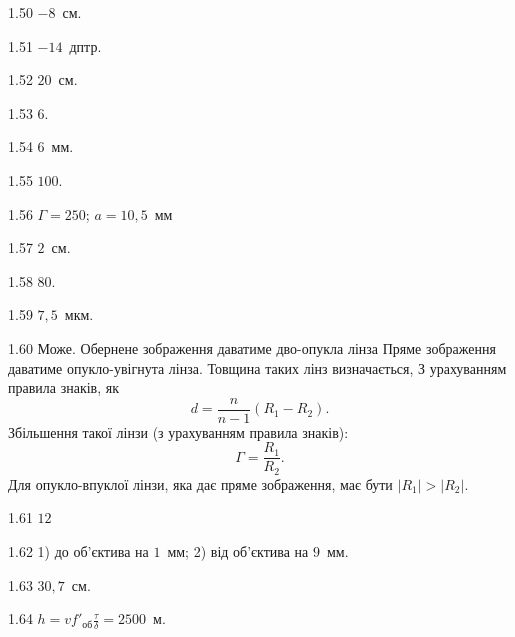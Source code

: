 \begin{Solution}{1.{50}}
	$-8$~см.
\end{Solution}
\begin{Solution}{1.{51}}
	$-14$~дптр.
\end{Solution}
\begin{Solution}{1.{52}}
	$20$~см.
\end{Solution}
\begin{Solution}{1.{53}}
	$6$.
\end{Solution}
\begin{Solution}{1.{54}}
	$6$~мм.
\end{Solution}
\begin{Solution}{1.{55}}
	$100$.
\end{Solution}
\begin{Solution}{1.{56}}
	$\Gamma = 250$; $a = 10,5$~мм
\end{Solution}
\begin{Solution}{1.{57}}
	$2$~см.
\end{Solution}
\begin{Solution}{1.{58}}
	$80$.
\end{Solution}
\begin{Solution}{1.{59}}
	$7,5$~мкм.
\end{Solution}
\begin{Solution}{1.{60}}
        Може. Обернене зображення даватиме дво-опукла лінза  Пряме зображення даватиме опукло-увігнута лінза.  Товщина таких лінз визначається,  З урахуванням правила знаків, як
        \begin{equation*}
            d = \frac{n}{n - 1} (R_1 - R_2).
        \end{equation*}
    Збільшення такої лінзи (з урахуванням правила знаків):
    \begin{equation*}
        \Gamma = \frac{R_1}{R_2}.
    \end{equation*}
    Для опукло-впуклої лінзи, яка дає пряме зображення, має бути $|R_1| > |R_2|$.
    
\end{Solution}
\begin{Solution}{1.{61}}
	$12$
\end{Solution}
\begin{Solution}{1.{62}}
	1) до об’єктива на $1$~мм; 2) від об’єктива на $9$~мм.
\end{Solution}
\begin{Solution}{1.{63}}
	$30,7$~см.
\end{Solution}
\begin{Solution}{1.{64}}
	$h = v f'_\text{об} \frac{\tau}{\delta} = 2500$~м.
\end{Solution}
